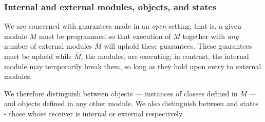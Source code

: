 \subsubsection{Internal and external modules, objects, and states}
 \label{s:concepts}

We are concerned with guarantees made in an \emph{open} setting; that is, a given module
$M$ must be programmed so that 
execution of $M$ together with \emph{any} number of external modules $\overline M$
will uphold these guarantees. %
These guarantees must be upheld while 
 $\overline M$, the  \emph{\externalM} modules, are executing; in contrast, the internal module may 
temporarily break them,
so long as they %
hold {upon entry to external modules.} 
 
    
We therefore distinguish between  \emph{\internalO}
objects --- instances of classes defined in $M$ ---
and \emph{\externalO} objects defined in any other module.
We also distinguish between
  \emph{\internalC} and   \emph{\externalC} states - those whose receiver is internal or external respectively. 
 
 
%




